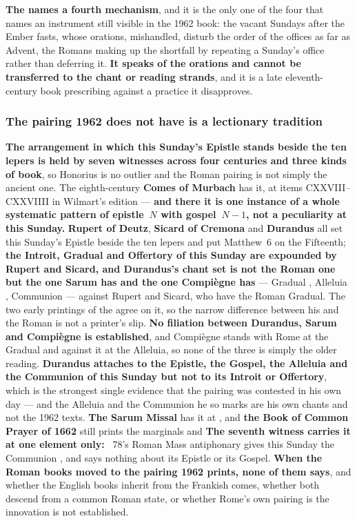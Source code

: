 \textbf{The  names a fourth mechanism}, and it is the only one
of the four that names an instrument still visible in the 1962 book: the vacant
Sundays after the Ember fasts, whose orations, mishandled, disturb the order of
the offices as far as Advent, the Romans making up the shortfall by repeating a
Sunday's office rather than deferring it.
\textbf{It speaks of the orations and cannot be transferred to the chant or
reading strands}, and it is a late eleventh-century book prescribing against a
practice it disapproves.

\subsubsection*{The pairing 1962 does not have is a lectionary tradition}

\textbf{The arrangement in which this Sunday's Epistle stands beside the ten
lepers is held by seven witnesses across four centuries and three kinds of
book}, so Honorius is no outlier and the Roman pairing is not simply the ancient
one. The eighth-century \textbf{Comes of Murbach} has it, at items
CXXVIII--CXXVIIII in Wilmart's edition --- \textbf{and there it is one instance
of a whole systematic pattern of epistle~$N$ with gospel~$N{-}1$, not a
peculiarity at this Sunday.} \textbf{Rupert of Deutz}, \textbf{Sicard of
Cremona} and \textbf{Durandus} all set this Sunday's Epistle beside the ten
lepers and put Matthew~6 on the Fifteenth; \textbf{the Introit, Gradual and
Offertory of this Sunday are expounded by Rupert and Sicard, and Durandus's
chant set is not the Roman one but the one Sarum has and the one Compiègne
has} --- Gradual , Alleluia
, Communion  --- against Rupert and Sicard, who have the Roman Gradual. The two
early printings of the  agree on it, so the narrow difference
between his  and the Roman  is not a printer's slip. \textbf{No
filiation between Durandus, Sarum and Compiègne is established}, and Compiègne
stands with Rome at the Gradual and against it at the Alleluia, so none of the
three is simply the older reading. \textbf{Durandus attaches  to the Epistle, the Gospel, the Alleluia and the Communion
of this Sunday but not to its Introit or Offertory}, which is the strongest
single evidence that the pairing was contested in his own day --- and the
Alleluia and the Communion he so marks are his own chants and not the 1962
texts. \textbf{The Sarum Missal} has it at
, and \textbf{the Book of Common Prayer of
1662} still prints the marginals  and  \textbf{The seventh witness carries it at one element only:} \work{Patrologia
Latina}~78's Roman Mass antiphonary gives this Sunday the Communion \latin{Panis
quem ego dedero}, and says nothing about its Epistle or its Gospel.
\textbf{When the Roman books moved to the pairing 1962 prints, none
of them says}, and whether the English books inherit from the Frankish comes,
whether both descend from a common Roman state, or whether Rome's own pairing is
the innovation is not established.

